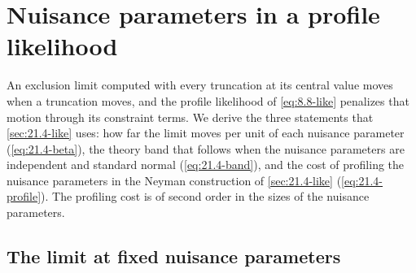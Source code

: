 \section{Nuisance parameters in a profile likelihood}\label{app:D.47}

An exclusion limit computed with every truncation at its central value moves when a truncation moves, and the profile likelihood of \cref{eq:8.8-like} penalizes that motion through its constraint terms. We derive the three statements that \cref{sec:21.4-like} uses: how far the limit moves per unit of each nuisance parameter (\cref{eq:21.4-beta}), the theory band that follows when the nuisance parameters are independent and standard normal (\cref{eq:21.4-band}), and the cost of profiling the nuisance parameters in the Neyman construction of \cref{sec:21.4-like} (\cref{eq:21.4-profile}). The profiling cost is of second order in the sizes of the nuisance parameters.

\subsection{The limit at fixed nuisance parameters}

